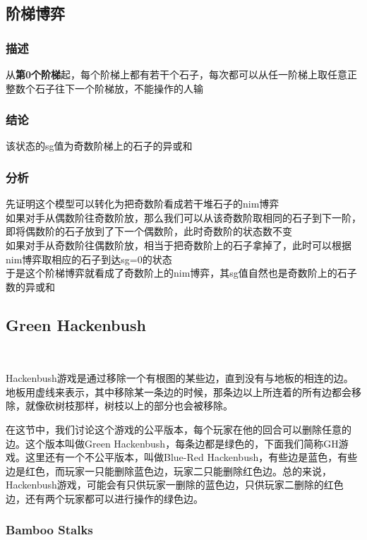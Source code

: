 	\subsection{阶梯博弈}
	\subsubsection{描述}
	从\textbf{第0个阶梯}起，每个阶梯上都有若干个石子，每次都可以从任一阶梯上取任意正整数个石子往下一个阶梯放，不能操作的人输
	\subsubsection{结论}
	该状态的sg值为奇数阶梯上的石子的异或和
	\subsubsection{分析}
	先证明这个模型可以转化为把奇数阶看成若干堆石子的nim博弈\\
	如果对手从偶数阶往奇数阶放，那么我们可以从该奇数阶取相同的石子到下一阶，即将偶数阶的石子放到了下一个偶数阶，此时奇数阶的状态数不变\\
	如果对手从奇数阶往偶数阶放，相当于把奇数阶上的石子拿掉了，此时可以根据nim博弈取相应的石子到达sg=0的状态\\
	于是这个阶梯博弈就看成了奇数阶上的nim博弈，其sg值自然也是奇数阶上的石子数的异或和\\
	\newpage
	\subsection{Green Hackenbush}~
	
	Hackenbush游戏是通过移除一个有根图的某些边，直到没有与地板的相连的边。地板用虚线来表示，其中移除某一条边的时候，那条边以上所连着的所有边都会移除，就像砍树枝那样，树枝以上的部分也会被移除。
	
	在这节中，我们讨论这个游戏的公平版本，每个玩家在他的回合可以删除任意的边。这个版本叫做Green Hackenbush，每条边都是绿色的，下面我们简称GH游戏。这里还有一个不公平版本，叫做Blue-Red Hackenbush，有些边是蓝色，有些边是红色，而玩家一只能删除蓝色边，玩家二只能删除红色边。总的来说，Hackenbush游戏，可能会有只供玩家一删除的蓝色边，只供玩家二删除的红色边，还有两个玩家都可以进行操作的绿色边。
	~\\
	\subsubsection{Bamboo Stalks}~
	

